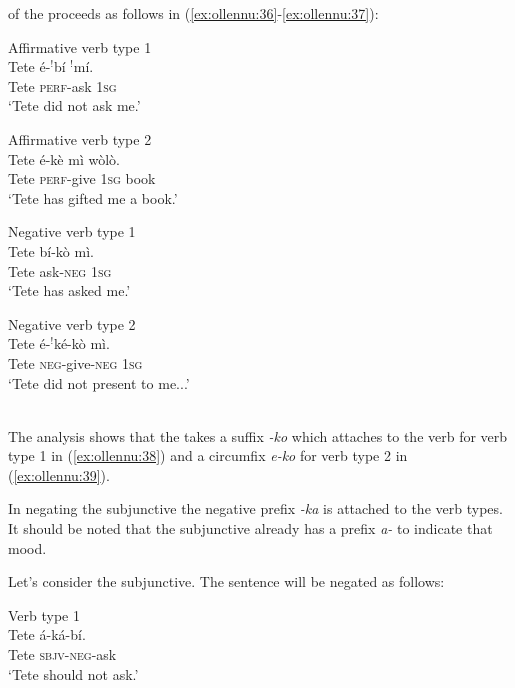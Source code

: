 \documentclass[output=paper
,newtxmath
,modfonts
,nonflat]{langsci/langscibook}
\begin{document}
 of the  proceeds as follows in (\ref{ex:ollennu:36}-\ref{ex:ollennu:37}):\\
\begin{minipage}{.5\textwidth}
\ea Affirmative verb type 1 \\\label{ex:ollennu:36}
\gll Tete \'e-$^{!}$b\'i $^{!}$m\'i.\\
Tete \textsc{perf}-ask 1\textsc{sg}\\
\glt `Tete did not ask me.'
\z
\end{minipage}
\begin{minipage}{.5\textwidth}
\ea Affirmative verb type 2 \\ \label{ex:ollennu:37}
\gll Tete \'e-k\`e m\`i w\`ol\`o.\\
Tete \textsc{perf}-give 1\textsc{sg} book\\
\glt `Tete has gifted me a book.'
\z
\end{minipage}
\begin{minipage}{.5\textwidth}
\ea Negative verb type 1 \\ \label{ex:ollennu:38}
\gll Tete b\'i-k\`o m\`i.\\
Tete ask-\textsc{neg} 1\textsc{sg}\\
\glt `Tete has asked me.'
\z
\end{minipage}
\begin{minipage}{.5\textwidth}
\ea Negative verb type 2 \\  \label{ex:ollennu:39}
 \gll Tete \'e-$^{!}$k\'e-k\`o m\`i.\\
Tete \textsc{neg}-give-\textsc{neg} 1\textsc{sg}\\
\glt `Tete did not present to me...'
\z
\end{minipage}\\
The analysis shows that the  takes a suffix \textit{-ko} which attaches to the verb for verb type 1 in (\ref{ex:ollennu:38}) and a circumfix \textit{e-ko} for verb type 2 in (\ref{ex:ollennu:39}).

In negating the subjunctive the negative prefix \textit{-ka} is attached to the verb types. It should be noted that the subjunctive already has a prefix \textit{a-} to indicate that mood.

Let’s consider the subjunctive. The sentence will be negated as follows:\\
\begin{minipage}{.5\textwidth}


\ea  Verb type 1 \\\label{ex:ollennu:40}
\gll Tete \'a-k\'a-b\'i.\\
Tete \textsc{sbjv}-\textsc{neg}-ask\\
\glt `Tete should not ask.'
\z
\end{minipage}
\end{document}
